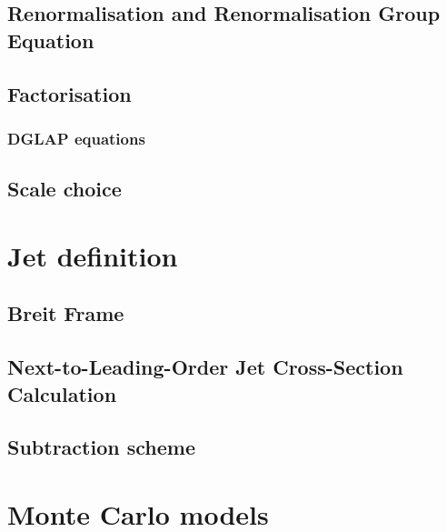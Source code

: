 \subsection{Renormalisation and Renormalisation Group Equation}


\subsection{Factorisation}
\label{subsec:factorisation}


\subsubsection{DGLAP equations}
\label{subsubsec:dglapeq}


\subsection{Scale choice}


\section{Jet definition}
\label{sec:jetalgo}


\subsection{Breit Frame}
\label{subsec:breitframe}


\subsection{Next-to-Leading-Order Jet Cross-Section Calculation}
\label{subsec:nlojetcalc}


\subsection{Subtraction scheme}
\label{subsec:subscheme}


%

\section{Monte Carlo models}
\label{sec:mcmodels}

